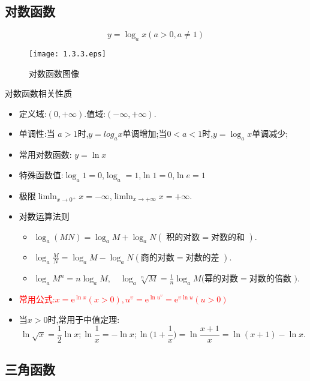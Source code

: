 \documentclass[12pt, a4paper, oneside, UTF8]{ctexbook}  %
\begin{document}
\begin{sloppypar}
    \subsection{对数函数}
    $$
        y=\log_a x (a>0,a \neq 1)
    $$
    \begin{figure}[H]
        \centering \texttt{[image: 1.3.3.eps]} \caption{对数函数图像}
    \end{figure}
    \begin{criterion}{对数函数相关性质}{}
        \begin{itemize}
            \item 定义域:$(0,+\infty)$.值域:$(-\infty,+\infty)$.
            \item 单调性:当 $a>1$时,$y=log_a x$单调增加;当$0<a<1$时,$y=\log_a x$单调减少;
            \item 常用对数函数: $y=\ln x$
            \item 特殊函数值:$\log_a 1=0$,$\log_a=1$,$\ln 1=0$,$\ln e=1$
            \item 极限$\operatorname*{lim ln}_{x\to0^{+}}x=-\infty$,$\operatorname*{lim ln}_{x\to+\infty}x=+\infty$.
            \item 对数运算法则
                  \begin{itemize}
                      \item $\log_{a}\left(MN\right)=\log_{a}M+\log_{a}N\left(\text{ 积的对数}=\text{对数的和 }\right).$
                      \item $\log_{a}\frac{M}{N}=\log_{a}M-\log_{a}N\left(商的对数=\text{对数的差 }\right).$
                      \item $\log_aM^n=n\log_aM,\quad\log_a\sqrt[n]{M}=\frac1n\log_aM\text{(幂的对数}=\text{对数的倍数 }).$
                  \end{itemize}
            \item \textcolor{red}{常用公式:$x=\mathrm{e}^{\ln x}\left(x>0\right),u^{\upsilon}=\mathrm{e}^{\ln u^v}=\mathrm{e}^{\upsilon\ln u}\left(u>0\right)$}
            \item 当$x>0$时,常用于中值定理:
                  $$
                      \ln\sqrt{x}=\frac{1}{2}\ln x;\ln\frac{1}{x}=-\ln x;\ln\biggl(1+\frac{1}{x}\biggr)=\ln\frac{x+1}{x}=\ln(x+1)-\ln x.
                  $$
        \end{itemize}
    \end{criterion}
    \subsection{三角函数}


\end{sloppypar}
\end{document}
